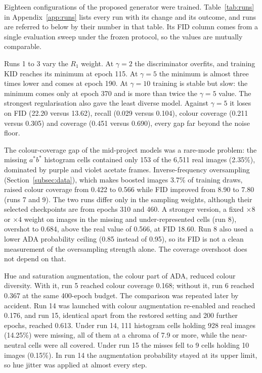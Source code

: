 \documentclass[electronics,article,submit,pdftex,moreauthors]{Definitions/mdpi}
\begin{document}
Eighteen configurations of the proposed generator were trained.
Table~\ref{tab:runs} in Appendix~\ref{app:runs} lists every run with its
change and its outcome, and runs are referred to below by their number in
that table. Its FID column comes from a single evaluation sweep under the
frozen protocol, so the values are mutually comparable.

Runs 1 to 3 vary the $R_1$ weight. At $\gamma = 2$ the discriminator
overfits, and training KID reaches its minimum at epoch 115. At $\gamma = 5$
the minimum is almost three times lower and comes at epoch 190. At
$\gamma = 10$ training is stable but slow: the minimum comes only at epoch
370 and is more than twice the $\gamma = 5$ value. The strongest
regularisation also gave the least diverse model. Against $\gamma = 5$ it
loses on FID (22.20 versus 13.62), recall (0.029 versus 0.104), colour
coverage (0.211 versus 0.305) and coverage (0.451 versus 0.690), every gap
far beyond the noise floor.

The colour-coverage gap of the mid-project models was a rare-mode problem:
the missing $a^*b^*$ histogram cells contained only 153 of the 6,511 real
images (2.35\%), dominated by purple and violet acetate frames.
Inverse-frequency oversampling (Section~\ref{subsec:data}), which makes
boosted images 3.7\% of training draws, raised colour coverage from 0.422 to
0.566 while FID improved from 8.90 to 7.80 (runs 7 and 9). The two runs
differ only in the sampling weights, although their selected checkpoints are
from epochs 310 and 460. A stronger version, a fixed $\times 8$ or
$\times 4$ weight on images in the missing and under-represented cells
(run 8), overshot to 0.684, above the real value of 0.566, at FID 18.60.
Run 8 also used a lower ADA probability ceiling (0.85 instead of 0.95), so
its FID is not a clean measurement of the oversampling strength alone. The
coverage overshoot does not depend on that.

Hue and saturation augmentation, the colour part of ADA, reduced colour
diversity. With it, run 5 reached colour coverage 0.168; without it, run 6
reached 0.367 at the same 400-epoch budget. The comparison was repeated later
by accident. Run 14 was launched with colour augmentation re-enabled and
reached 0.176, and run 15, identical apart from the restored setting and 200
further epochs, reached 0.613. Under run 14, 111 histogram cells holding 928
real images (14.25\%) were missing, all of them at a chroma of 7.9 or more,
while the near-neutral cells were all covered. Under run 15 the misses fell
to 9 cells holding 10 images (0.15\%). In run 14 the augmentation probability
stayed at its upper limit, so hue jitter was applied at almost every step.
\end{document}
